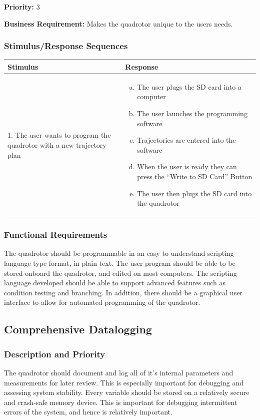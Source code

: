 \documentclass[english]{article}
\numberwithin{equation}{section} %
\begin{document}
\textbf{Priority:} 3

\textbf{Business Requirement:} Makes the quadrotor unique to the users needs.

\subsubsection{Stimulus/Response Sequences}

\begin{tabular}{p{3cm} | p{8.5cm}}
\hline
\textbf{Stimulus} & \textbf{Response}\\
\hline
1. The user wants to program the quadrotor with a new trajectory plan &
\begin{enumerate}[(a)]\itemsep1pt %
\item The user plugs the SD card into a computer
\item The user launches the programming software
\item Trajectories are entered into the software
\item When the user is ready they can press the ``Write to SD Card'' Button
\item The user then plugs the SD card into the quadrotor
\end{enumerate}
\\ 
\hline
\end{tabular}
\subsubsection{Functional Requirements}
The quadrotor should be programmable in an easy to understand scripting language type format, in plain text. The user program should be able to be stored onboard the quadrotor, and edited on most computers. The scripting language developed should be able to support advanced features such as condition testing and branching. In addition, there should be a graphical user interface to allow for automated programming of the quadrotor.
\bigskip

\subsection{Comprehensive Datalogging}
\subsubsection{Description and Priority}
The quadrotor should document and log all of it's internal parameters and measurements for later review. This is especially important for debugging and assessing system stability. Every variable should be stored on a relatively secure and crash-safe memory device. This is important for debugging intermittent errors of the system, and hence is relatively important.
\end{document}
